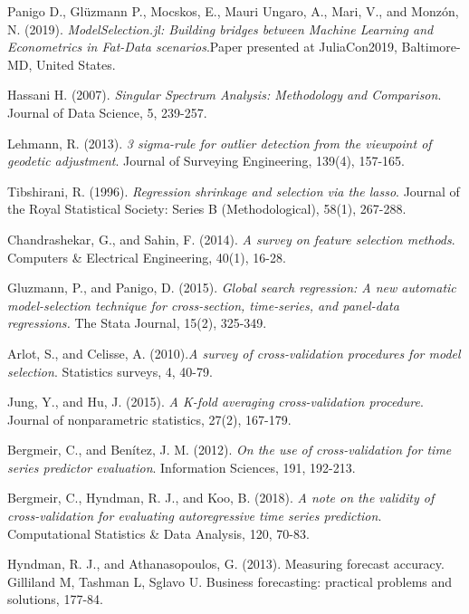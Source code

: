 \documentclass{article}
\begin{document}
  
\begin{thebibliography}{1}

Panigo D., Glüzmann P., Mocskos, E., Mauri Ungaro, A., Mari, V., and Monzón, N. (2019). \textit{ModelSelection.jl: Building bridges between Machine Learning and Econometrics in Fat-Data scenarios}.Paper presented at JuliaCon2019, Baltimore-MD, United States.

Hassani H. (2007). \textit{Singular Spectrum Analysis: Methodology and Comparison}. Journal of Data Science, 5, 239-257.

Lehmann, R. (2013). \textit{3 sigma-rule for outlier detection from the viewpoint of geodetic adjustment}. Journal of Surveying Engineering, 139(4), 157-165.

Tibshirani, R. (1996). \textit{Regression shrinkage and selection via the lasso}. Journal of the Royal Statistical Society: Series B (Methodological), 58(1), 267-288.

Chandrashekar, G., and Sahin, F. (2014). \textit{A survey on feature selection methods}. Computers & Electrical Engineering, 40(1), 16-28.

Gluzmann, P., and Panigo, D. (2015). \textit{Global search regression: A new automatic model-selection technique for cross-section, time-series, and panel-data regressions.} The Stata Journal, 15(2), 325-349.

Arlot, S., and Celisse, A. (2010).\textit{A survey of cross-validation procedures for model selection}. Statistics surveys, 4, 40-79.

Jung, Y., and Hu, J. (2015). \textit{A K-fold averaging cross-validation procedure}. Journal of nonparametric statistics, 27(2), 167-179.

Bergmeir, C., and Benítez, J. M. (2012). \textit{On the use of cross-validation for time series predictor evaluation}. Information Sciences, 191, 192-213.

Bergmeir, C., Hyndman, R. J., and Koo, B. (2018). \textit{A note on the validity of cross-validation for evaluating autoregressive time series prediction}. Computational Statistics & Data Analysis, 120, 70-83.

Hyndman, R. J., and Athanasopoulos, G. (2013). Measuring forecast accuracy. Gilliland M, Tashman L, Sglavo U. Business forecasting: practical problems and solutions, 177-84.

\end{thebibliography}
\end{document}
